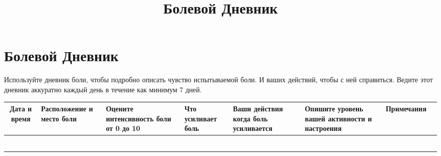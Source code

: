 \documentclass{worksheet_landscape}
\title{Болевой Дневник}
\begin{document}
\section*{\huge{Болевой Дневник}}

\begin{flushleft}
{Используйте дневник боли, чтобы подробно описать чувство испытываемой боли. И
ваших действий, чтобы с ней справиться. Ведите этот дневник аккуратно каждый день в течение как минимум 7 дней. }
\end{flushleft}

\begin{table}[htbp]
\begin{center}
\renewcommand{\arraystretch}{1.8}
\begin{tabularx}{\textwidth}{|>{\small}c|Y|Y|Y|Y|Y|Y|Y|}
\hline
\textbf{Дата и время} & \textbf{Расположение и место боли} & \textbf{Оцените
  интенсивность боли от 0 до 10} & \textbf{Что усиливает боль} & \textbf{Ваши
  действия когда боль усиливается} & \textbf{Опишите уровень вашей активности и
  настроения} & \textbf{Примечания} \\
\hline
 & & & & & &  \\[26pt]
\hline
 & & & & & &  \\[26pt]
\hline
 & & & & & &  \\[26pt]
\hline
 & & & & & &  \\[26pt]
\hline
 & & & & & &  \\[26pt]
\hline
 & & & & & &  \\[26pt]
\hline
\end{tabularx}
\end{center}
\label{tab:activity_diary}
\end{table}
\end{document}
